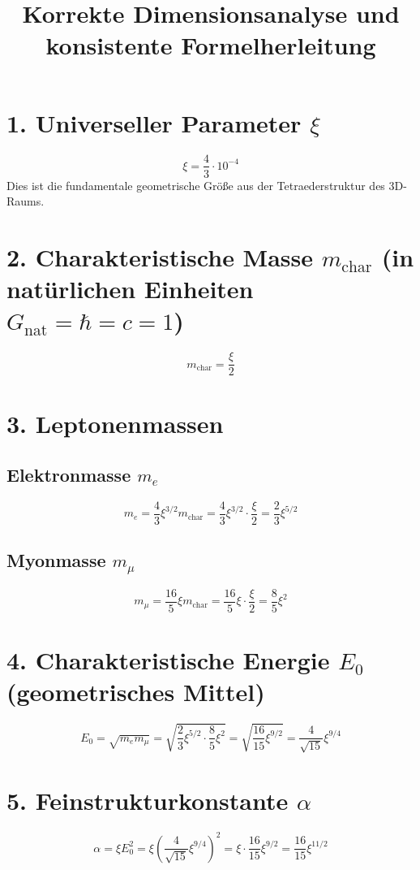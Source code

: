 \documentclass[12pt, a4paper]{article}
\title{Korrekte Dimensionsanalyse und konsistente Formelherleitung}
\author{}
\date{}
\begin{document}
	
	\maketitle
	
\section*{1. Universeller Parameter $\xi$}
\[
\xi = \frac{4}{3} \cdot 10^{-4}
\]
Dies ist die fundamentale geometrische Größe aus der Tetraederstruktur des 3D-Raums.

\section*{2. Charakteristische Masse $m_{\text{char}}$ (in natürlichen Einheiten $G_{\text{nat}} = \hbar = c = 1$)}
\[
m_{\text{char}} = \frac{\xi}{2}
\]

\section*{3. Leptonenmassen}
\subsection*{Elektronmasse $m_e$}
\[
m_e = \frac{4}{3} \xi^{3/2} m_{\text{char}} = \frac{4}{3} \xi^{3/2} \cdot \frac{\xi}{2} = \frac{2}{3} \xi^{5/2}
\]

\subsection*{Myonmasse $m_\mu$}
\[
m_\mu = \frac{16}{5} \xi m_{\text{char}} = \frac{16}{5} \xi \cdot \frac{\xi}{2} = \frac{8}{5} \xi^2
\]

\section*{4. Charakteristische Energie $E_0$ (geometrisches Mittel)}
\[
E_0 = \sqrt{m_e m_\mu} = \sqrt{ \frac{2}{3} \xi^{5/2} \cdot \frac{8}{5} \xi^2 } = \sqrt{ \frac{16}{15} \xi^{9/2} } = \frac{4}{\sqrt{15}} \xi^{9/4}
\]

\section*{5. Feinstrukturkonstante $\alpha$}
\[
\alpha = \xi E_0^2 = \xi \left( \frac{4}{\sqrt{15}} \xi^{9/4} \right)^2 = \xi \cdot \frac{16}{15} \xi^{9/2} = \frac{16}{15} \xi^{11/2}
\]
\end{document}
